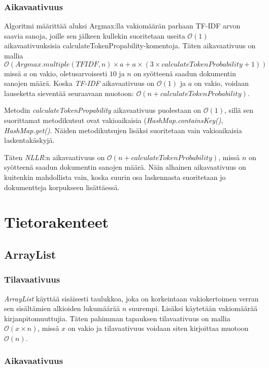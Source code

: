 \documentclass[12pt,a4paper]{article}
\begin{document}
\subsubsection*{Aikavaativuus}
Algoritmi määrittää aluksi Argmax:lla vakiomäärän parhaan TF-IDF arvon saavia sanoja, joille sen jälkeen kullekin suoritetaan useita $\mathcal{O}(1)$ aikavaativuuksisia calculateTokenPropability-komentoja. Täten aikavaativuus on mallia 
$$\mathcal{O}(Argmax.multiple(TFIDF, n) \times a  + a \times (3 \times calculateTokenProbability + 1))$$
missä $a$ on vakio, oletusarvoisesti $10$ ja $n$ on syötteenä saadun dokumentin sanojen määrä. Koska \textit{TF-IDF} aikavaativuus on $\mathcal{O}(1)$ ja $a$ on vakio, voidaan lauseketta sieventää seuraavaan muotoon: $\mathcal{O}(n + calculateTokenProbability)$.

Metodin \textit{calculateTokenPropability} aikavaativuus puolestaan on $\mathcal{O}(1)$, sillä sen suorittamat metodikutsut ovat vakioaikaisia (\textit{HashMap.containsKey()}, \textit{HashMap.get()}. Näiden metodikutsujen lisäksi suoritetaan vain vakioaikaisia laskentakäskyjä.

Täten \textit{NLLR}:n aikavaativuus on $\mathcal{O}(n + calculateTokenProbability)$, missä $n$ on syötteenä saadun dokumentin sanojen määrä. Näin alhainen aikavaativuus on kuitenkin mahdollista vain, koska suurin osa laskennasta suoritetaan jo dokumentteja korpukseen lisättäessä.

\pagebreak
\section{Tietorakenteet}

\subsection{ArrayList}

\subsubsection*{Tilavaativuus}

\textit{ArrayList} käyttää sisäisesti taulukkoa, joka on korkeintaan vakiokertoimen verran sen sisältämien alkioiden lukumäärää $n$ suurempi. Lisäksi käytetään vakiomäärää kirjanpitomuuttujia. Täten pahimman tapauksen tilavaativuus on mallia $\mathcal{O}(x \times n)$, missä $x$ on vakio ja tilavaativuus voidaan siten kirjoittaa muotoon $\mathcal{O}(n)$.

\subsubsection*{Aikavaativuus}
\end{document}
